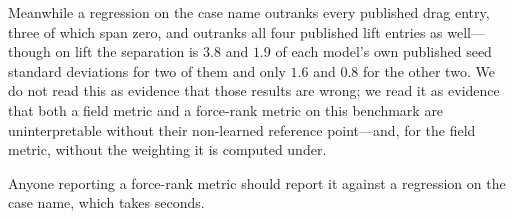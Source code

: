 
Meanwhile a regression on the case name outranks every published drag
entry, three of which span zero, and outranks all four published lift entries as
well---though on lift the separation is $3.8$ and $1.9$ of each model's own published seed
standard deviations for two of them and only $1.6$ and $0.8$ for the other two. We do not
read this as evidence that those results are wrong; we read it as evidence that both a
field metric and a force-rank metric on this benchmark are uninterpretable without their
non-learned reference point---and, for the field metric, without the weighting it is
computed under.


Anyone reporting a force-rank metric should report
it against a regression on the case name, which takes seconds.
